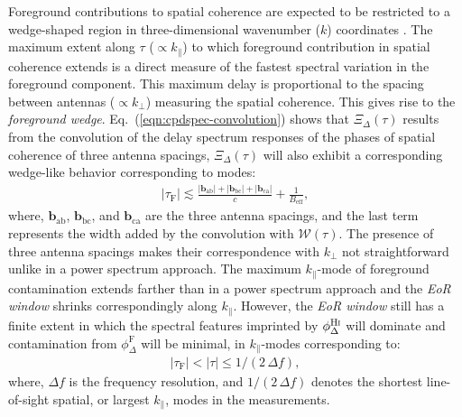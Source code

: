 \documentclass[
reprint,
superscriptaddress,
amsmath,
amssymb,
aps,
prd
]{revtex4-1}
\begin{document}
Foreground contributions to spatial coherence are expected to be restricted to a wedge-shaped region in three-dimensional wavenumber ($k$) coordinates \cite{bow09,liu09,liu14a,liu14b,dat10,liu11,gho12,mor12,par12b,tro12,ved12,dil13,pob13,thy13,thy15a,thy15b,thy16,dil14}. The maximum extent along $\tau$ ($\propto k_\parallel$) to which foreground contribution in spatial coherence extends is a direct measure of the fastest spectral variation in the foreground component. This maximum delay is proportional to the spacing between antennas ($\propto k_\perp$) measuring the spatial coherence. This gives rise to the {\it foreground wedge}. Eq.~(\ref{eqn:cpdspec-convolution}) shows that $\Xi_\Delta(\tau)$ results from the convolution of the delay spectrum responses of the phases of spatial coherence of three antenna spacings, $\Xi_\Delta(\tau)$ will also exhibit a corresponding wedge-like behavior corresponding to modes:
\begin{align}
  |\tau_\textrm{F}| \lesssim \frac{|\bm{b}_\textrm{ab}| + |\bm{b}_\textrm{bc}| + |\bm{b}_\textrm{ca}|}{c} + \frac{1}{B_\textrm{eff}}, \label{eqn:cp-FG-wedge}
\end{align}
where, $\bm{b}_\textrm{ab}$, $\bm{b}_\textrm{bc}$, and $\bm{b}_\textrm{ca}$ are the three antenna spacings, and the last term represents the width added by the convolution with $\mathcal{W}(\tau)$. The presence of three antenna spacings makes their correspondence with $k_\perp$ not straightforward unlike in a power spectrum approach. The maximum $k_\parallel$-mode of foreground contamination extends farther than in a power spectrum approach and the {\it EoR window} shrinks  correspondingly along $k_\parallel$. However, the {\it EoR window} still has a finite extent in which the spectral features imprinted by $\phi_\Delta^\textrm{H{\sc i}}$ will dominate and contamination from $\phi_\Delta^\textrm{F}$ will be minimal, in $k_\parallel$-modes corresponding to:
\begin{align}
  |\tau_\textrm{F}| < |\tau| \leq 1/(2\,\Delta f), \label{eqn:cp-EoR-window}
\end{align}
where, $\Delta f$ is the frequency resolution, and $1/(2\,\Delta f)$ denotes the shortest line-of-sight spatial, or largest $k_\parallel$, modes in the measurements.
\end{document}
